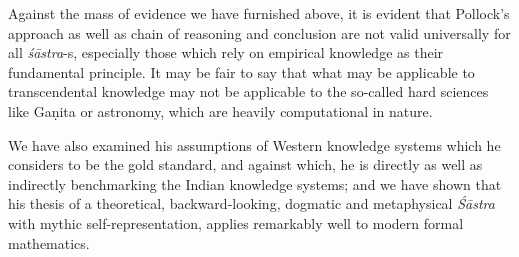 Against the mass of evidence we have furnished above, it is evident that Pollock’s approach as well as chain of reasoning and conclusion are not valid universally for all {\sl śāstra}-s, especially those which rely on empirical knowledge as their fundamental principle. It may be fair to say that what may be applicable to transcendental knowledge may not be applicable to the so-called hard sciences like Gaṇita or astronomy, which are heavily computational in nature. 

We have also examined his assumptions of Western knowledge systems which he considers to be the gold standard, and against which, he is directly as well as indirectly benchmarking the Indian knowledge systems; and we have shown that his thesis of a theoretical, backward-looking, dogmatic and metaphysical {\sl Śāstra} with mythic self-representation, applies remarkably well to modern formal mathematics.

